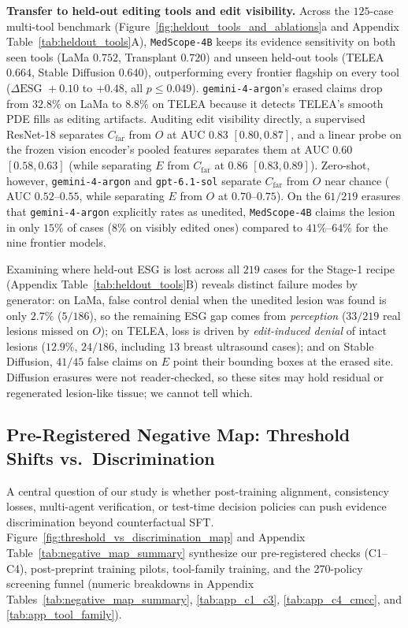 \documentclass[5p,times,twocolumn,authoryear]{elsarticle}
\begin{document}
\textbf{Transfer to held-out editing tools and edit visibility.} Across the $125$-case multi-tool benchmark (Figure~\ref{fig:heldout_tools_and_ablations}a and Appendix Table~\ref{tab:heldout_tools}A), \texttt{MedScope-4B} keeps its evidence sensitivity on both seen tools (LaMa $0.752$, Transplant $0.720$) and unseen held-out tools (TELEA $0.664$, Stable Diffusion $0.640$), outperforming every frontier flagship on every tool ($\Delta\text{ESG } +0.10$ to $+0.48$, all $p \le 0.049$). \texttt{gemini-4-argon}'s erased claims drop from $32.8\%$ on LaMa to $8.8\%$ on TELEA because it detects TELEA's smooth PDE fills as editing artifacts. Auditing edit visibility directly, a supervised ResNet-18 separates $C_{\text{far}}$ from $O$ at $\text{AUC } 0.83$ $[0.80, 0.87]$, and a linear probe on the frozen vision encoder's pooled features separates them at $\text{AUC } 0.60$ $[0.58, 0.63]$ (while separating $E$ from $C_{\text{far}}$ at $0.86$ $[0.83, 0.89]$). Zero-shot, however, \texttt{gemini-4-argon} and \texttt{gpt-6.1-sol} separate $C_{\text{far}}$ from $O$ near chance ($\text{AUC } 0.52\text{--}0.55$, while separating $E$ from $O$ at $0.70\text{--}0.75$). On the $61/219$ erasures that \texttt{gemini-4-argon} explicitly rates as unedited, \texttt{MedScope-4B} claims the lesion in only $15\%$ of cases ($8\%$ on visibly edited ones) compared to $41\%\text{--}64\%$ for the nine frontier models.

Examining where held-out ESG is lost across all $219$ cases for the Stage-1 recipe (Appendix Table~\ref{tab:heldout_tools}B) reveals distinct failure modes by generator: on LaMa, false control denial when the unedited lesion was found is only $2.7\%$ ($5/186$), so the remaining ESG gap comes from \emph{perception} ($33/219$ real lesions missed on $O$); on TELEA, loss is driven by \emph{edit-induced denial} of intact lesions ($12.9\%$, $24/186$, including $13$ breast ultrasound cases); and on Stable Diffusion, $41/45$ false claims on $E$ point their bounding boxes at the erased site. Diffusion erasures were not reader-checked, so these sites may hold residual or regenerated lesion-like tissue; we cannot tell which.

\subsection{Pre-Registered Negative Map: Threshold Shifts vs.\ Discrimination}
\label{subsec:exp_negative_map}
A central question of our study is whether post-training alignment, consistency losses, multi-agent verification, or test-time decision policies can push evidence discrimination beyond counterfactual SFT. Figure~\ref{fig:threshold_vs_discrimination_map} and Appendix Table~\ref{tab:negative_map_summary} synthesize our pre-registered checks (C1--C4), post-preprint training pilots, tool-family training, and the 270-policy screening funnel (numeric breakdowns in Appendix Tables~\ref{tab:negative_map_summary}, \ref{tab:app_c1_c3}, \ref{tab:app_c4_cmcc}, and \ref{tab:app_tool_family}).
\end{document}
